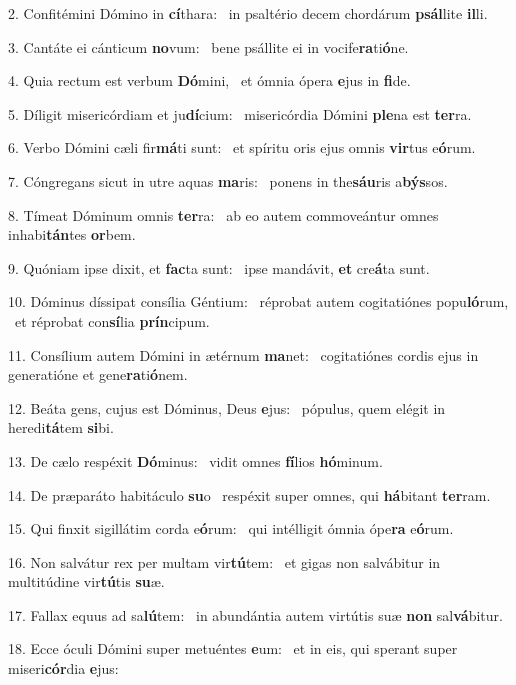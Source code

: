 2. Confitémini Dómino in \textbf{cí}thara: \ast\  in psaltério decem chordárum \textbf{psál}lite \textbf{il}li.\

3. Cantáte ei cánticum \textbf{no}vum: \ast\  bene psállite ei in vocife\textbf{ra}ti\textbf{ó}ne.\

4. Quia rectum est verbum \textbf{Dó}mini, \ast\  et ómnia ópera \textbf{e}jus in \textbf{fi}de.\

5. Díligit misericórdiam et ju\textbf{dí}cium: \ast\  misericórdia Dómini \textbf{ple}na est \textbf{ter}ra.\

6. Verbo Dómini cæli fir\textbf{má}ti sunt: \ast\  et spíritu oris ejus omnis \textbf{vir}tus e\textbf{ó}rum.\

7. Cóngregans sicut in utre aquas \textbf{ma}ris: \ast\  ponens in the\textbf{sáu}ris a\textbf{býs}sos.\

8. Tímeat Dóminum omnis \textbf{ter}ra: \ast\  ab eo autem commoveántur omnes inhabi\textbf{tán}tes \textbf{or}bem.\

9. Quóniam ipse dixit, et \textbf{fac}ta sunt: \ast\  ipse mandávit, \textbf{et} cre\textbf{á}ta sunt.\

10. Dóminus díssipat consília Géntium: \dag\  réprobat autem cogitatiónes popu\textbf{ló}rum, \ast\  et réprobat con\textbf{sí}lia \textbf{prín}cipum.\

11. Consílium autem Dómini in ætérnum \textbf{ma}net: \ast\  cogitatiónes cordis ejus in generatióne et gene\textbf{ra}ti\textbf{ó}nem.\

12. Beáta gens, cujus est Dóminus, Deus \textbf{e}jus: \ast\  pópulus, quem elégit in heredi\textbf{tá}tem \textbf{si}bi.\

13. De cælo respéxit \textbf{Dó}minus: \ast\  vidit omnes \textbf{fí}lios \textbf{hó}minum.\

14. De præparáto habitáculo \textbf{su}o \ast\  respéxit super omnes, qui \textbf{há}bitant \textbf{ter}ram.\

15. Qui finxit sigillátim corda e\textbf{ó}rum: \ast\  qui intélligit ómnia ópe\textbf{ra} e\textbf{ó}rum.\

16. Non salvátur rex per multam vir\textbf{tú}tem: \ast\  et gigas non salvábitur in multitúdine vir\textbf{tú}tis \textbf{su}æ.\

17. Fallax equus ad sa\textbf{lú}tem: \ast\  in abundántia autem virtútis suæ \textbf{non} sal\textbf{vá}bitur.\

18. Ecce óculi Dómini super metuéntes \textbf{e}um: \ast\  et in eis, qui sperant super miseri\textbf{cór}dia \textbf{e}jus:\

